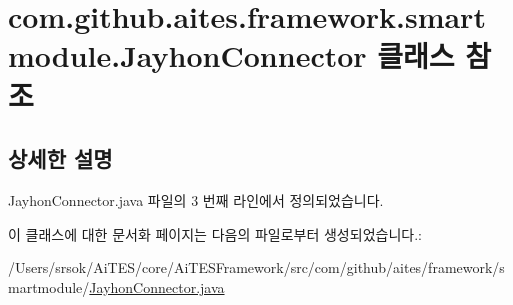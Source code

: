 \hypertarget{classcom_1_1github_1_1aites_1_1framework_1_1smartmodule_1_1_jayhon_connector}{}\section{com.\+github.\+aites.\+framework.\+smartmodule.\+Jayhon\+Connector 클래스 참조}
\label{classcom_1_1github_1_1aites_1_1framework_1_1smartmodule_1_1_jayhon_connector}


\subsection{상세한 설명}


Jayhon\+Connector.\+java 파일의 3 번째 라인에서 정의되었습니다.



이 클래스에 대한 문서화 페이지는 다음의 파일로부터 생성되었습니다.\+:\begin{DoxyCompactItemize}
\item 
/\+Users/srsok/\+Ai\+T\+E\+S/core/\+Ai\+T\+E\+S\+Framework/src/com/github/aites/framework/smartmodule/\mbox{\hyperlink{_jayhon_connector_8java}{Jayhon\+Connector.\+java}}\end{DoxyCompactItemize}
